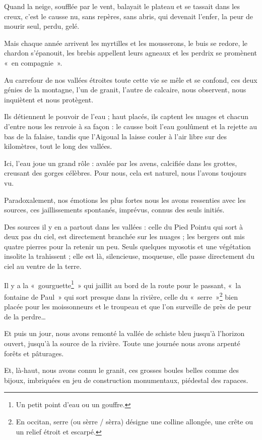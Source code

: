 Quand la neige, soufflée par le vent, balayait le plateau et se tassait dans les creux, c’est le
causse nu, sans repères, sans abris, qui devenait l’enfer, la peur de mourir seul, perdu, gelé.

Mais chaque année arrivent les myrtilles et les mousserons, le buis se redore, le chardon
s’épanouit, les brebis appellent leurs agneaux et les perdrix se promènent «~en compagnie~».

Au carrefour de nos vallées étroites toute cette vie se mêle et se confond, ces deux génies de
la montagne, l’un de granit, l’autre de calcaire, nous observent, nous inquiètent et nous
protègent.

Ils détiennent le pouvoir de l’eau ; haut placés, ils captent les nuages et chacun d’entre nous
les renvoie à sa façon : le causse boit l’eau goulûment et la rejette au bas de la falaise, tandis
que l’Aigoual la laisse couler à l’air libre sur des kilomètres, tout le long des vallées.

Ici, l’eau joue un grand rôle : avalée par les avens, calcifiée dans les grottes, creusant des
gorges célèbres. Pour nous, cela est naturel, nous l’avons toujours vu.

Paradoxalement, nos émotions les plus fortes nous les avons ressenties avec les sources, ces
jaillissements spontanés, imprévus, connus des seuls initiés.

Des sources il y en a partout dans les vallées : celle du Pied Pointu qui sort à deux pas du ciel,
est directement branchée sur les nuages ; les bergers ont mis quatre pierres pour la retenir un
peu. Seuls quelques myosotis et une végétation insolite la trahissent ; elle est là, silencieuse,
moqueuse, elle passe directement du ciel au ventre de la terre.

Il y a la «~gourguette\footnote{Un petit point d'eau ou un gouffre.}~» qui jaillit au bord de la route pour le passant, «~la fontaine de
Paul~» qui sort presque dans la rivière, celle du «~serre~»\footnote{En occitan, serre (ou sèrre / sèrra) désigne une colline allongée, une crête ou un relief étroit et escarpé.} bien placée pour les moissonneurs et
le troupeau et que l’on surveille de près de peur de la perdre…

Et puis un jour, nous avons remonté la vallée de schiste bleu jusqu’à l’horizon ouvert, jusqu’à
la source de la rivière. Toute une journée nous avons arpenté forêts et pâturages.

Et, là-haut, nous avons connu le granit, ces grosses boules belles comme des bijoux,
imbriquées en jeu de construction monumentaux, piédestal des rapaces.

